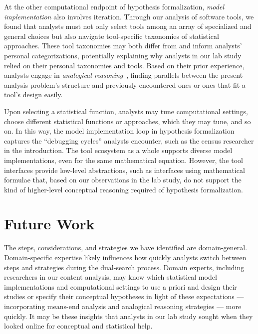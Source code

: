 At the other computational endpoint of hypothesis formalization, \textit{model implementation}
also involves iteration. Through our analysis of software tools, we
found that analysts must not only select tools among an array of specialized and
general choices but also navigate tool-specific taxonomies of statistical
approaches. These tool taxonomies may both differ from and inform analysts'
personal categorizations, potentially explaining why analysts in our lab study
relied on their personal taxonomies and tools. Based on their prior experience, analysts engage in
\textit{analogical reasoning}~\cite{holland1989induction}, finding parallels between the present analysis
problem's structure and previously encountered ones or ones that fit a tool's
design easily.

Upon selecting a statistical function, analysts may tune computational settings,
choose different statistical functions or approaches, which they may tune, and
so on. In this way, the model implementation loop in hypothesis
formalization captures the ``debugging cycles'' analysts encounter, such as the census
researcher in the introduction. The tool ecosystem as a
whole supports diverse model implementations, even for the same
mathematical equation. However, the tool interfaces provide low-level abstractions, such as
interfaces using mathematical formulae that, based on our observations in the
lab study, do not support the kind of higher-level conceptual reasoning required
of hypothesis formalization.


\section{Future Work}
The steps, considerations, and strategies we have identified are domain-general.
Domain-specific expertise likely influences how quickly analysts switch between
steps and strategies during the dual-search process. Domain experts, including
researchers in our content analysis, may know which statistical model
implementations and computational settings to use a priori and design their
studies or specify their conceptual hypotheses in light of these expectations
--- incorporating means-end analysis and analogical reasoning strategies ---
more quickly. It may be these insights that analysts in our lab study sought
when they looked online for conceptual and statistical help. 


